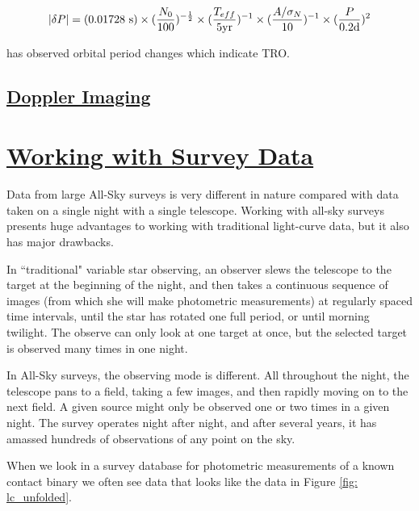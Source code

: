 \documentclass[12pt]{article} %
\numberwithin{equation}{section} %
\begin{document}
\citep{horne1986prescription} 

\begin{equation} \label{eqn: horne_baliunas}
|\delta P| = (0.01728\text{ s}) \times (\frac{N_{0}}{100})^{-\frac{1}{2}} \times (\frac{T_{eff}}{5\text{yr}})^{-1} \\  \times (\frac{A/ \sigma_{N}}{10})^{-1} \times (\frac{P}{0.2\text{d}})^{2}
\end{equation}


\citet{qian2001orbital} has observed orbital period changes which indicate TRO. 

\subsection[Doppler Imaging]{\hyperlink{toc}{Doppler Imaging}} \label{sec: doppler_imaging}

\section[Working with Survey Data]{\hyperlink{toc}{Working with Survey Data}} \label{sec: Working with Survey Data}

Data from large All-Sky surveys is very different in nature compared with data taken on a single night with a single telescope. Working with all-sky surveys presents huge advantages to working with traditional light-curve data, but it also has major drawbacks.

In ``traditional" variable star observing, an observer slews the telescope to the target at the beginning of the night, and then takes a continuous sequence of images (from which she will make photometric measurements) at regularly spaced time intervals, until the star has rotated one full period, or until morning twilight. The observe can only look at one target at once, but the selected target is observed many times in one night.

In All-Sky surveys, the observing mode is different. All throughout the night, the telescope pans to a field, taking a few images, and then rapidly moving on to the next field. A given source might only be observed one or two times in a given night. The survey operates night after night, and after several years, it has amassed hundreds of observations of any point on the sky.

When we look in a survey database for photometric measurements of a known contact binary we often see data that looks like the data in Figure \ref{fig: lc_unfolded}. 
\end{document}
